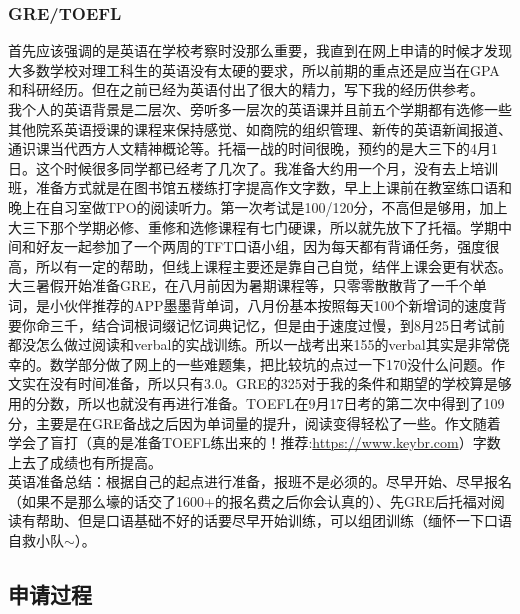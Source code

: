 \documentclass[a4paper,UTF8]{book}
\begin{document}
        \subsubsection*{GRE/TOEFL}
        首先应该强调的是英语在学校考察时没那么重要，我直到在网上申请的时候才发现大多数学校对理工科生的英语没有太硬的要求，所以前期的重点还是应当在GPA和科研经历。但在之前已经为英语付出了很大的精力，写下我的经历供参考。\\
        我个人的英语背景是二层次、旁听多一层次的英语课并且前五个学期都有选修一些其他院系英语授课的课程来保持感觉、如商院的组织管理、新传的英语新闻报道、通识课当代西方人文精神概论等。托福一战的时间很晚，预约的是大三下的4月1日。这个时候很多同学都已经考了几次了。我准备大约用一个月，没有去上培训班，准备方式就是在图书馆五楼练打字提高作文字数，早上上课前在教室练口语和晚上在自习室做TPO的阅读听力。第一次考试是100/120分，不高但是够用，加上大三下那个学期必修、重修和选修课程有七门硬课，所以就先放下了托福。学期中间和好友一起参加了一个两周的TFT口语小组，因为每天都有背诵任务，强度很高，所以有一定的帮助，但线上课程主要还是靠自己自觉，结伴上课会更有状态。\\
        大三暑假开始准备GRE，在八月前因为暑期课程等，只零零散散背了一千个单词，是小伙伴推荐的APP墨墨背单词，八月份基本按照每天100个新增词的速度背要你命三千，结合词根词缀记忆词典记忆，但是由于速度过慢，到8月25日考试前都没怎么做过阅读和verbal的实战训练。所以一战考出来155的verbal其实是非常侥幸的。数学部分做了网上的一些难题集，把比较坑的点过一下170没什么问题。作文实在没有时间准备，所以只有3.0。GRE的325对于我的条件和期望的学校算是够用的分数，所以也就没有再进行准备。TOEFL在9月17日考的第二次中得到了109分，主要是在GRE备战之后因为单词量的提升，阅读变得轻松了一些。作文随着学会了盲打（真的是准备TOEFL练出来的！推荐:\url{https://www.keybr.com}）字数上去了成绩也有所提高。\\
        英语准备总结：根据自己的起点进行准备，报班不是必须的。尽早开始、尽早报名（如果不是那么壕的话交了1600+的报名费之后你会认真的）、先GRE后托福对阅读有帮助、但是口语基础不好的话要尽早开始训练，可以组团训练（缅怀一下口语自救小队$\sim$）。

    \subsection*{申请过程}
\end{document}
